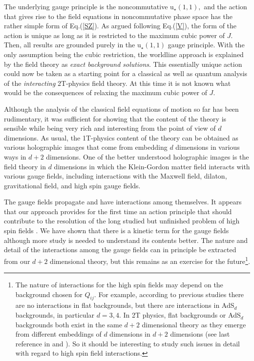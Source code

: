 \documentclass[a4paper,12pt]{article}
\begin{document}
The underlying gauge principle is the noncommutative u$_{\star }\left(
1,1\right) ,$ and the action that gives rise to the field equations in
noncommutative phase space has the rather simple form of Eq.(\ref{SZ}). As
argued following Eq.(\ref{V}), the form of the action is unique as long as
it is restricted to the maximum cubic power of $J.$ Then, all results are
grounded purely in the u$_{\star }\left( 1,1\right) $ gauge principle$.$
With the only assumption being the cubic restriction, the worldline approach
is explained by the field theory as \textit{exact background solutions}.
This essentially unique action could now be taken as a starting point for a
classical as well as quantum analysis of the \textit{interacting} 2T-physics
field theory. At this time it is not known what would be the consequences of
relaxing the maximum cubic power of $J$.

Although the analysis of the classical field equations of motion so far has
been rudimentary, it was sufficient for showing that the content of the
theory is sensible while being very rich and interesting from the point of
view of $d$ dimensions. As usual, the 1T-physics content of the theory can
be obtained as various holographic images that come from embedding $d$
dimensions in various ways in $d+2$ dimensions. One of the better understood
holographic images \cite{Dirac}\cite{field2T} is the field theory in $d$
dimensions in which the Klein-Gordon matter field interacts with various
gauge fields, including interactions with the Maxwell field, dilaton,
gravitational field, and high spin gauge fields.

The gauge fields propagate and have interactions among themselves. It
appears that our approach provides for the first time an action principle
that should contribute to the resolution of the long studied but unfinished
problem of high spin fields \cite{vasil}\cite{segal}\cite{highspin}\cite
{sezgin}. We have shown that there is a kinetic term for the gauge fields
although more study is needed to understand its contents better. The nature
and detail of the interactions among the gauge fields can in principle be
extracted from our $d+2$ dimensional theory, but this remains as an exercise
for the future\footnote{%
The nature of interactions for the high spin fields may depend on the
background chosen for $Q_{ij}$. For example, according to previous studies 
\cite{vasil} there are no interactions in flat backgrounds, but there are
interactions in AdS$_{d}$ backgrounds, in particular $d=3,4$. In 2T physics,
flat backgrounds or AdS$_{d}$ backgrounds both exist in the same $d+2$
dimensional theory as they emerge from different embeddings of $d$
dimensions in $d+2$ dimensions (see last reference in \cite{old2T} and \cite
{field2T}). So it should be interesting to study such issues in detail with
regard to high spin field interactions.}.
\end{document}
